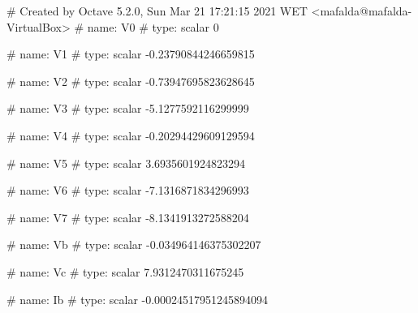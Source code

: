 # Created by Octave 5.2.0, Sun Mar 21 17:21:15 2021 WET <mafalda@mafalda-VirtualBox>
# name: V0
# type: scalar
0


# name: V1
# type: scalar
-0.23790844246659815


# name: V2
# type: scalar
-0.73947695823628645


# name: V3
# type: scalar
-5.1277592116299999


# name: V4
# type: scalar
-0.20294429609129594


# name: V5
# type: scalar
3.6935601924823294


# name: V6
# type: scalar
-7.1316871834296993


# name: V7
# type: scalar
-8.1341913272588204


# name: Vb
# type: scalar
-0.034964146375302207


# name: Vc
# type: scalar
7.9312470311675245


# name: Ib
# type: scalar
-0.00024517951245894094


